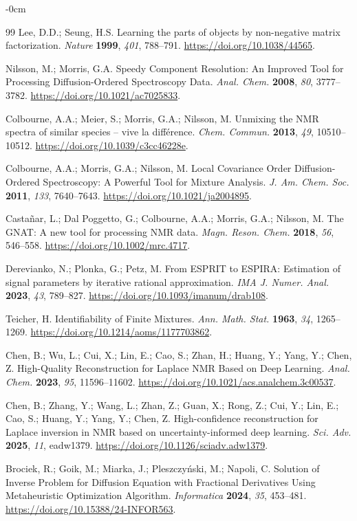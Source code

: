 \documentclass[mathematics,article,accept,moreauthors]{Definitions/mdpi}
\begin{document}
\begin{adjustwidth}{-\extralength}{0cm}
\begin{thebibliography}{99}
Lee, D.D.; Seung, H.S. Learning the parts of objects by non-negative matrix factorization. \emph{Nature} \textbf{1999}, \emph{401}, 788--791. \url{https://doi.org/10.1038/44565}.

Nilsson, M.; Morris, G.A. Speedy Component Resolution: An Improved Tool for Processing Diffusion-Ordered Spectroscopy Data. \emph{Anal. Chem.} \textbf{2008}, \emph{80}, 3777--3782. \url{https://doi.org/10.1021/ac7025833}.

Colbourne, A.A.; Meier, S.; Morris, G.A.; Nilsson, M. Unmixing the NMR spectra of similar species -- vive la différence. \emph{Chem. Commun.} \textbf{2013}, \emph{49}, 10510--10512. \url{https://doi.org/10.1039/c3cc46228e}.

Colbourne, A.A.; Morris, G.A.; Nilsson, M. Local Covariance Order Diffusion-Ordered Spectroscopy: A Powerful Tool for Mixture Analysis. \emph{J. Am. Chem. Soc.} \textbf{2011}, \emph{133}, 7640--7643. \url{https://doi.org/10.1021/ja2004895}.

Castañar, L.; Dal Poggetto, G.; Colbourne, A.A.; Morris, G.A.; Nilsson, M. The GNAT: A new tool for processing NMR data. \emph{Magn. Reson. Chem.} \textbf{2018}, \emph{56}, 546--558. \url{https://doi.org/10.1002/mrc.4717}.

Derevianko, N.; Plonka, G.; Petz, M. From ESPRIT to ESPIRA: Estimation of signal parameters by iterative rational approximation. \emph{IMA J. Numer. Anal.} \textbf{2023}, \emph{43}, 789--827. \url{https://doi.org/10.1093/imanum/drab108}.

Teicher, H. Identifiability of Finite Mixtures. \emph{ Ann. Math. Stat.} \textbf{1963}, \emph{34}, 1265--1269. \url{https://doi.org/10.1214/aoms/1177703862}.

Chen, B.; Wu, L.; Cui, X.; Lin, E.; Cao, S.; Zhan, H.; Huang, Y.; Yang, Y.; Chen, Z. High-Quality Reconstruction for Laplace NMR Based on Deep Learning. \emph{Anal. Chem.} \textbf{2023}, \emph{95}, 11596--11602. \url{https://doi.org/10.1021/acs.analchem.3c00537}.

Chen, B.; Zhang, Y.; Wang, L.; Zhan, Z.; Guan, X.; Rong, Z.; Cui, Y.; Lin, E.; Cao, S.; Huang, Y.; Yang, Y.; Chen, Z. High-confidence reconstruction for Laplace inversion in NMR based on uncertainty-informed deep learning. \emph{Sci. Adv.} \textbf{2025}, \emph{11}, eadw1379. \url{https://doi.org/10.1126/sciadv.adw1379}.

Brociek, R.; Goik, M.; Miarka, J.; Pleszczy\'nski, M.; Napoli, C. Solution of Inverse Problem for Diffusion Equation with Fractional Derivatives Using Metaheuristic Optimization Algorithm. \emph{Informatica} \textbf{2024}, \emph{35}, 453--481. \url{https://doi.org/10.15388/24-INFOR563}.


\end{thebibliography}
\end{adjustwidth}
\end{document}
